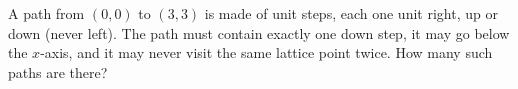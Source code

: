 A path from $(0,0)$ to $(3,3)$ is made of unit steps, each one unit right, up or down (never left). The path must contain exactly one down step, it may go below the $x$-axis, and it may never visit the same lattice point twice. How many such paths are there?
